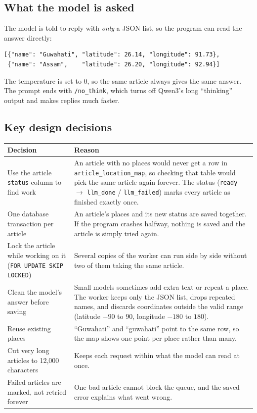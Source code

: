 \documentclass[11pt,a4paper]{article}
\begin{document}
\subsection{What the model is asked}

The model is told to reply with \emph{only} a JSON list, so the program can read
the answer directly:

\begin{verbatim}
[{"name": "Guwahati", "latitude": 26.14, "longitude": 91.73},
 {"name": "Assam",    "latitude": 26.20, "longitude": 92.94}]
\end{verbatim}

The temperature is set to 0, so the same article always gives the same answer.
The prompt ends with \texttt{/no\_think}, which turns off Qwen3's long
``thinking'' output and makes replies much faster.

\subsection{Key design decisions}

\begin{center}
\begin{tabular}{|p{5cm}|p{9cm}|}
\hline
\textbf{Decision} & \textbf{Reason} \\
\hline
Use the article \texttt{status} column to find work & An article with no places would never get a row in \texttt{article\_location\_map}, so checking that table would pick the same article again forever. The status (\texttt{ready} $\rightarrow$ \texttt{llm\_done} / \texttt{llm\_failed}) marks every article as finished exactly once. \\
\hline
One database transaction per article & An article's places and its new status are saved together. If the program crashes halfway, nothing is saved and the article is simply tried again. \\
\hline
Lock the article while working on it (\texttt{FOR UPDATE SKIP LOCKED}) & Several copies of the worker can run side by side without two of them taking the same article. \\
\hline
Clean the model's answer before saving & Small models sometimes add extra text or repeat a place. The worker keeps only the JSON list, drops repeated names, and discards coordinates outside the valid range (latitude $-90$ to $90$, longitude $-180$ to $180$). \\
\hline
Reuse existing places & ``Guwahati'' and ``guwahati'' point to the same row, so the map shows one point per place rather than many. \\
\hline
Cut very long articles to 12{,}000 characters & Keeps each request within what the model can read at once. \\
\hline
Failed articles are marked, not retried forever & One bad article cannot block the queue, and the saved error explains what went wrong. \\
\hline
\end{tabular}
\end{center}
\end{document}
